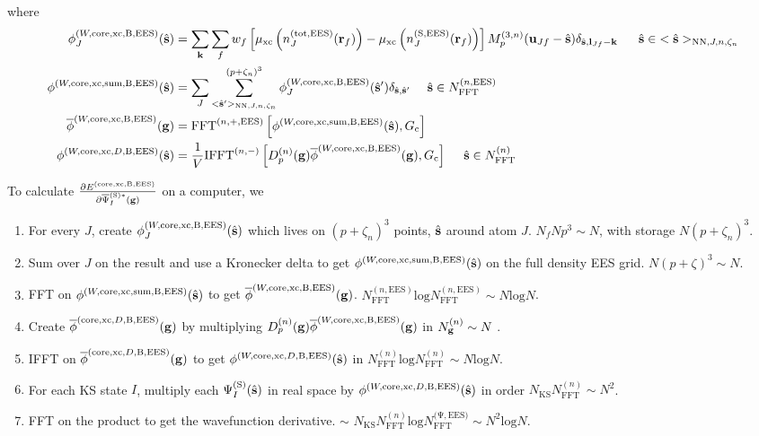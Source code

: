 \documentclass[paper=a4, fontsize=11pt]{article} %
\numberwithin{equation}{section} %
\numberwithin{figure}{section} %
\numberwithin{table}{section} %
\newcommand{\p}{\partial}
\newcommand{\ol}{\overline}
\newcommand{\bu}{{\bf{u}}}
\newcommand{\bl}{{\bf{l}}}
\newcommand{\bk}{{\bf{k}}}
\newcommand{\bs}{{\bf{s}}}
\newcommand{\bg}{{\bf{g}}}
\newcommand{\br}{{\bf{r}}}
\newcommand{\hs}{{\hat{\bf{s}}}}
\newcommand{\rS}{{\mathrm{S}}}
\newcommand{\rEES}{{\mathrm{EES}}}
\newcommand{\rxc}{{\mathrm{xc}}}
\newcommand{\rcore}{{\mathrm{core}}}
\newcommand{\rNN}{{\mathrm{NN}}}
\newcommand{\rB}{{\mathrm{B}}}
\newcommand{\rsum}{{\mathrm{sum}}}
\newcommand{\rl}{{\mathrm{log}}}
\newcommand{\rtot}{{\mathrm{tot}}}
\newcommand{\psigsc}{{\overline \Psi_I^{(\rS)*}(\bg)}}
\newcommand{\NKS}{{N_{\mathrm{KS}}}}
\newcommand{\NFFTn}{{N^{(n)}_{\mathrm{FFT}}}}
\newcommand{\NFFTnEES}{{N^{(n,\rEES)}_{\mathrm{FFT}}}}
\newcommand{\NFFTpEES}{{N^{\mathrm{(\Psi,\rEES})}_{\mathrm{FFT}}}}
\newcommand{\Ngn}{{N^{(n)}_\bg}}
\newcommand{\Gc}{{G_{\mathrm{c}}}}
\newcommand{\Dng}{{D^{(n)}_p(\bg)}}
\newcommand{\Mn}{{M_p^{(3,n)}}}
\newcommand{\FFTnEES}{{\mathrm{FFT}^{(n,+,\rEES)}}}
\newcommand{\IFFTni}{{\mathrm{IFFT}^{(n,-)}}}
\newcommand{\pzn}{{(p+\zeta_n)^3}}
\newcommand{\hsJn}{{<\hs>_{\rNN,J,n,\zeta_n}}}
\newcommand{\hsinJn}{{\ \ \ \ \ \hs  \in  \hsJn}}
\newcommand{\hspJn}{{<\hs'>_{\rNN,J,n,\zeta_n}}}
\newcommand{\hsinnEES}{{\ \ \ \ \hs \in \NFFTnEES}}
\newcommand{\hsinn}{{\ \ \ \ \hs \in \NFFTn}}
\begin{document}
where
\begin{equation}
\begin{split}
\phi_J^{(W,\rcore,\rxc,\rB,\rEES)}(\hs)&=  \sum_{\bk} \sum_f w_f \left[\mu_{\rxc} \left(  n^{(\rtot,\rEES)}_J(\br_f)  \right) -\mu_{\rxc}\left(n_J^{(\rS,\rEES)}(\br_f)\right)\right] \Mn(\bu_{Jf}-\hat \bs)\delta_{\hat \bs,\bl_{Jf}-\bk} \hsinJn \\
\phi^{(W,\rcore,\rxc,\rsum,\rB,\rEES)}(\hs)
&= \sum_J \sum_{\hspJn}^\pzn \phi_J^{(W,\rcore,\rxc,\rB,\rEES)}(\hs')\delta_{\hs,\hs'}  \hsinnEES \\
\ol \phi^{(W,\rcore,\rxc,\rB,\rEES)}(\bg) &= \FFTnEES  \left[ \phi^{(W,\rcore,\rxc,\rsum,\rB,\rEES)}(\hs),\Gc \right]\\
\phi^{(W,\rcore,\rxc,D,\rB,\rEES)}(\hs) &= \frac{1}{V} \IFFTni \left[ \Dng \ol \phi^{(W,\rcore,\rxc,\rB,\rEES)}(\bg),\Gc\right] \hsinn \\
\end{split}
\end{equation}

To calculate $\frac{\p E^{(\rcore,\rxc,\rB,\rEES)}}{\p \psigsc}$ on a computer, we
\begin{enumerate}
\item For every $J$, create $\phi_J^{(W,\rcore,\rxc,\rB,\rEES)}(\hs)$ which lives on $\pzn$ points, $\hat \bs$ around atom $J$. $N_f N p^3 \sim N$, with storage $N \pzn$.
\item Sum over $J$ on the result and use a Kronecker delta to get $\phi^{(W,\rcore,\rxc,\rsum,\rB,\rEES)}(\hs)$ on the full density EES grid. $N (p+\zeta)^3 \sim N$.
\item FFT on $\phi^{(W,\rcore,\rxc,\rsum,\rB,\rEES)}(\hs)$ to get $\ol \phi^{(W,\rcore,\rxc,\rB,\rEES)}(\bg)$. $\NFFTnEES \rl \NFFTnEES \sim N \rl N$.
\item Create $\ol \phi^{(\rcore,\rxc,D,\rB,\rEES)}(\bg)$ by multiplying $\Dng \ol \phi^{(W,\rcore,\rxc,\rB,\rEES)}(\bg)$ in $\Ngn \sim N$ .
\item IFFT on $\ol \phi^{(\rcore,\rxc,D,\rB,\rEES)}(\bg)$ to get $\phi^{(W,\rcore,\rxc,D,\rB,\rEES)}(\hs)$ in $\NFFTn \rl \NFFTn \sim N \rl N$.
\item For each KS state $I$, multiply each $\Psi_{I}^{(\rS)}(\hat \bs)$ in real space by $\phi^{(W,\rcore,\rxc,D,\rB,\rEES)}(\hs)$ in order $\NKS \NFFTn \sim N^2$.
\item FFT on the product to get the wavefunction derivative. $\sim$ $\NKS \NFFTn \rl \NFFTpEES \sim N^2 \rl N$.
\end{enumerate}
\end{document}
